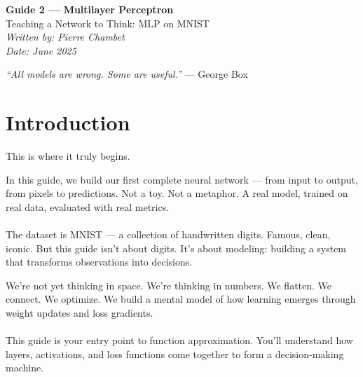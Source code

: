 \documentclass[11pt]{article}
\begin{document}
\begin{center}
    {\LARGE \textbf{Guide 2 — Multilayer Perceptron}} \\[0.5em]
    {\large Teaching a Network to Think: MLP on MNIST} \\[1em]
    \textit{Written by: Pierre Chambet} \\
    \textit{Date: June 2025}
\end{center}

\vspace{2em}

\begin{tcolorbox}[colback=gray!5!white, colframe=gray!50!black, title=Quote of the Journey]
\textit{“All models are wrong. Some are useful.”} \hfill — George Box
\end{tcolorbox}

\vspace{1.5em}

\section*{Introduction}

This is where it truly begins.

In this guide, we build our first complete neural network — from input to output, from pixels to predictions. Not a toy. Not a metaphor. A real model, trained on real data, evaluated with real metrics.

\paragraph{}
The dataset is MNIST — a collection of handwritten digits. Famous, clean, iconic. But this guide isn’t about digits. It’s about modeling: building a system that transforms observations into decisions.

We’re not yet thinking in space. We’re thinking in numbers. We flatten. We connect. We optimize. We build a mental model of how learning emerges through weight updates and loss gradients.

\paragraph{}
This guide is your entry point to function approximation. You’ll understand how layers, activations, and loss functions come together to form a decision-making machine.

\vspace{1em}
\end{document}
